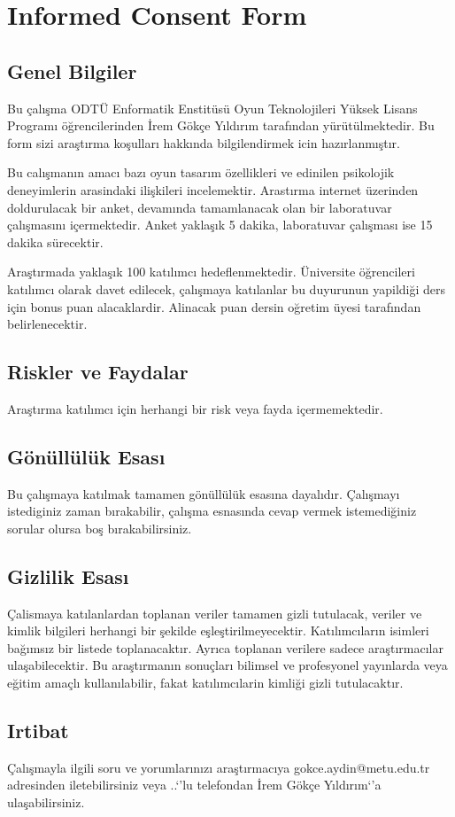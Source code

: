 \chapter {Informed Consent Form}
\label {chp:appendixA}

\section* {Genel Bilgiler}
Bu çalışma ODTÜ Enformatik Enstitüsü Oyun Teknolojileri Yüksek Lisans Programı öğrencilerinden İrem Gökçe Yıldırım tarafından yürütülmektedir. Bu form sizi araştırma koşulları hakkında bilgilendirmek icin hazırlanmıştır.

Bu calışmanın amacı bazı oyun tasarım özellikleri ve edinilen psikolojik deneyimlerin arasindaki ilişkileri incelemektir. Arastırma internet üzerinden doldurulacak bir anket, devamında tamamlanacak olan bir laboratuvar çalışmasını içermektedir. Anket yaklaşık 5 dakika, laboratuvar çalışması ise 15 dakika sürecektir.

Araştırmada yaklaşık 100 katılımcı hedeflenmektedir. Üniversite öğrencileri katılımcı olarak davet edilecek, çalışmaya katılanlar bu duyurunun yapildiği ders için bonus puan alacaklardir. Alinacak puan dersin oğretim üyesi tarafından belirlenecektir.
\section* {Riskler ve Faydalar}
Araştırma katılımcı için herhangi bir risk veya fayda içermemektedir.
\section* {Gönüllülük Esası}
Bu çalışmaya katılmak tamamen gönüllülük esasına dayalıdır. Çalışmayı istediginiz zaman bırakabilir, çalışma esnasında cevap vermek istemediğiniz sorular olursa boş bırakabilirsiniz.
\section* {Gizlilik Esası}
Çalismaya katılanlardan toplanan veriler tamamen gizli tutulacak, veriler ve kimlik bilgileri herhangi bir şekilde eşleştirilmeyecektir. Katılımcıların isimleri bağımsız bir listede toplanacaktır. Ayrıca toplanan verilere sadece araştırmacılar ulaşabilecektir. Bu araştırmanın sonuçları bilimsel ve profesyonel yayınlarda veya eğitim amaçlı kullanılabilir, fakat katılımcılarin kimliği gizli tutulacaktır.
\section* {Irtibat}
Çalışmayla ilgili soru ve yorumlarınızı araştırmacıya gokce.aydin@metu.edu.tr adresinden iletebilirsiniz veya ..`'lu telefondan İrem Gökçe Yıldırım`'a ulaşabilirsiniz.
